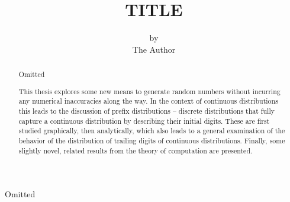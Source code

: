 \documentclass{article}
\title{\vspace{-1cm}TITLE}%
\author{by\\The Author}
\date{}
\begin{document}
\maketitle
\vspace{2cm}
\begin{center}
\doublespacing
Omitted
\end{center}

\thispagestyle{empty}

\newpage

\setcounter{page}{2}

\renewcommand\abstractname{\textsc{ABSTRACT}}
\begin{abstract}
\begin{center}
Omitted
\end{center}
\doublespacing
This thesis explores some new means to generate random numbers without incurring any numerical inaccuracies along the way. In the context of continuous distributions this leads to the discussion of prefix distributions -- discrete distributions that fully capture a continuous distribution by describing their initial digits. These are first studied graphically, then analytically, which also leads to a general examination of the behavior of the distribution of trailing digits of continuous distributions. Finally, some slightly novel, related results from the theory of computation are presented.
\end{abstract}

\newpage

\renewcommand{\contentsname}{\begin{center}TABLE OF CONTENTS\end{center}}
\tableofcontents
\end{document}
